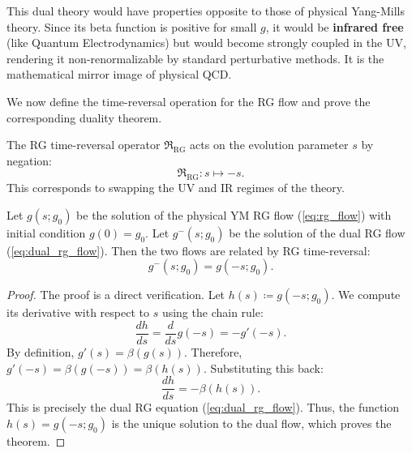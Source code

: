 This dual theory would have properties opposite to those of physical Yang-Mills theory. Since its beta function is positive for small $g$, it would be \textbf{infrared free} (like Quantum Electrodynamics) but would become strongly coupled in the UV, rendering it non-renormalizable by standard perturbative methods. It is the mathematical mirror image of physical QCD.

We now define the time-reversal operation for the RG flow and prove the corresponding duality theorem.

\begin{definition}
The RG time-reversal operator $\mathfrak{R}_{\text{RG}}$ acts on the evolution parameter $s$ by negation:
\begin{equation}
    \mathfrak{R}_{\text{RG}}: s \mapsto -s.
\end{equation}
This corresponds to swapping the UV and IR regimes of the theory.
\end{definition}

\begin{theorem}
Let $g(s; g_0)$ be the solution of the physical YM RG flow (\cref{eq:rg_flow}) with initial condition $g(0) = g_0$. Let $g^-(s; g_0)$ be the solution of the dual RG flow (\cref{eq:dual_rg_flow}). Then the two flows are related by RG time-reversal:
\begin{equation}
    g^-(s; g_0) = g(-s; g_0).
\end{equation}
\end{theorem}
\begin{proof}
The proof is a direct verification. Let $h(s) \coloneqq g(-s; g_0)$. We compute its derivative with respect to $s$ using the chain rule:
\begin{equation*}
    \frac{dh}{ds} = \frac{d}{ds} g(-s) = -g'(-s).
\end{equation*}
By definition, $g'(s) = \beta(g(s))$. Therefore, $g'(-s) = \beta(g(-s)) = \beta(h(s))$. Substituting this back:
\begin{equation*}
    \frac{dh}{ds} = -\beta(h(s)).
\end{equation*}
This is precisely the dual RG equation (\cref{eq:dual_rg_flow}). Thus, the function $h(s) = g(-s; g_0)$ is the unique solution to the dual flow, which proves the theorem.
\end{proof}

